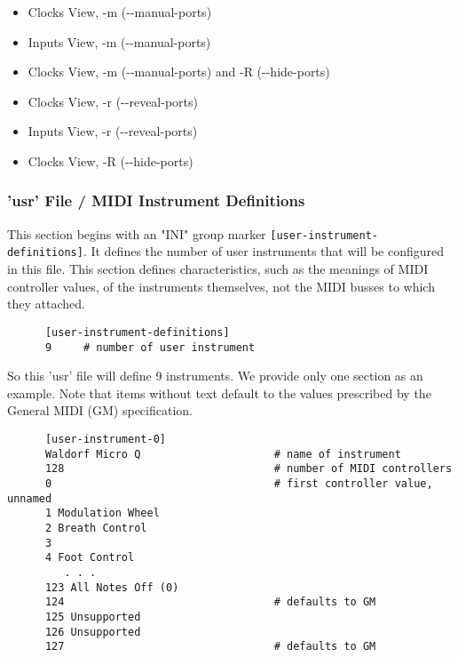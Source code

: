   \begin{itemize}
      \item Clocks View, -m (-{}-manual-ports)
      \item Inputs View, -m (-{}-manual-ports)
      \item Clocks View, -m (-{}-manual-ports) and -R (-{}-hide-ports)
      \item Clocks View, -r (-{}-reveal-ports)
      \item Inputs View, -r (-{}-reveal-ports)
      \item Clocks View, -R (-{}-hide-ports)
   \end{itemize}

\subsubsection{'usr' File / MIDI Instrument Definitions}
\label{subsubsec:usr_file_midi_instrument_definitions}

   This section begins with an
   "INI" group marker \texttt{[user-instrument-definitions]}.
   It defines the number of user instruments that will be configured in this
   file.  This section defines characteristics, such as
   the meanings of MIDI controller values, of the instruments themselves,
   not the MIDI busses to which they attached.

   \begin{verbatim}
      [user-instrument-definitions]
      9     # number of user instrument
   \end{verbatim}

   So this 'usr' file will define 9 instruments.  We provide only one section
   as an example.  Note that items without text default to the values
   prescribed by the General MIDI (GM) specification.

   \begin{verbatim}
      [user-instrument-0]
      Waldorf Micro Q                     # name of instrument
      128                                 # number of MIDI controllers
      0                                   # first controller value, unnamed
      1 Modulation Wheel
      2 Breath Control
      3 
      4 Foot Control
         . . .
      123 All Notes Off (0)
      124                                 # defaults to GM
      125 Unsupported
      126 Unsupported
      127                                 # defaults to GM
   \end{verbatim}

